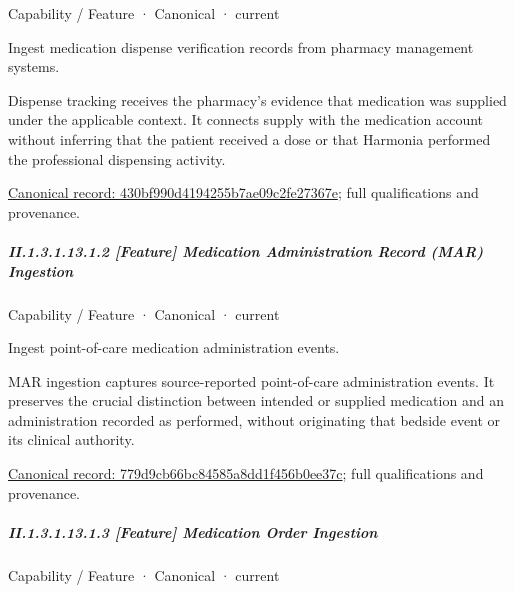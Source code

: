 \label{element:430bf990d4194255b7ae09c2fe27367e}
{\small Capability / Feature · Canonical · current}\par

Ingest medication dispense verification records from pharmacy management systems.



Dispense tracking receives the pharmacy's evidence that medication was supplied under the applicable context. It connects supply with the medication account without inferring that the patient received a dose or that Harmonia performed the professional dispensing activity.


{\footnotesize \href{../../../../continuum/strategy/capability/feature/430bf990d4194255b7ae09c2fe27367e.md}{Canonical record: 430bf990d4194255b7ae09c2fe27367e}; full qualifications and provenance.}\par
\subparagraph*{II.1.3.1.13.1.2 [Feature] Medication Administration Record (MAR) Ingestion}
\label{navigation:II.1.3.1.13.1.2}

\label{element:779d9cb66bc84585a8dd1f456b0ee37c}
{\small Capability / Feature · Canonical · current}\par

Ingest point-of-care medication administration events.



MAR ingestion captures source-reported point-of-care administration events. It preserves the crucial distinction between intended or supplied medication and an administration recorded as performed, without originating that bedside event or its clinical authority.


{\footnotesize \href{../../../../continuum/strategy/capability/feature/779d9cb66bc84585a8dd1f456b0ee37c.md}{Canonical record: 779d9cb66bc84585a8dd1f456b0ee37c}; full qualifications and provenance.}\par
\subparagraph*{II.1.3.1.13.1.3 [Feature] Medication Order Ingestion}
\label{navigation:II.1.3.1.13.1.3}

\label{element:5247b47f181243bb975ae2cd70db65ba}
{\small Capability / Feature · Canonical · current}\par

